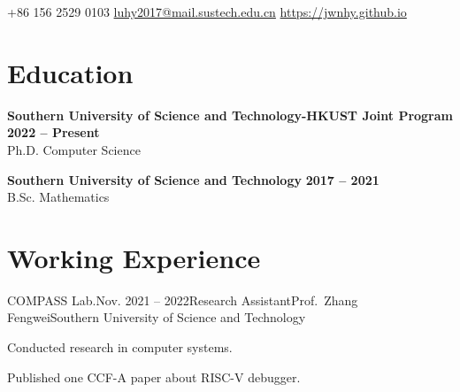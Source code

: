 \documentclass{resume}
\begin{document}
\begin{center}
    \contact
        {+86 156 2529 0103}
        {\href{mailto://luhy2017@mail.sustech.edu.cn}{luhy2017@mail.sustech.edu.cn}}
        {\href{https://jwnhy.github.io}{https://jwnhy.github.io}}
\end{center}

\section{Education} 
\begin{content}
    {\bf Southern University of Science and Technology-HKUST Joint Program}     
    \hfill {\bf 2022
    -- Present} 
    \\ {Ph.D. Computer Science} 

    {\bf Southern University of Science and Technology} \hfill {\bf 2017 -- 
    2021} \\ 
    {B.Sc. Mathematics} \hfill 
    
\sectionlineskip
\end{content}

\section{Working Experience}
\begin{content}

    \begin{position}{COMPASS Lab.}{Nov. 2021 -- 2022}{Research 
    Assistant}{Prof.~Zhang Fengwei}{Southern University of Science and 
    Technology}
    \item Conducted research in computer systems.
    \item Published one CCF-A paper about RISC-V debugger.
    \end{position}

\sectionlineskip
\end{content}
\vspace{-3\medskipamount}

\noindent
\renewcommand{\refname}{Publications}   %
\nocite{*}
\sectionlineskip
\end{document}
